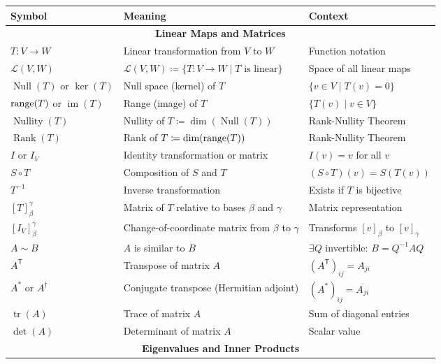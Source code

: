 \begin{center}
\vspace{0.5cm} %

\begin{tabularx}{\textwidth}{|l|X|X|}
\hline
\textbf{Symbol} & \textbf{Meaning} & \textbf{Context} \\
\hline
\multicolumn{3}{|c|}{\textbf{Linear Maps and Matrices}} \\
\hline
$T: V \to W$ & Linear transformation from $V$ to $W$ & Function notation \\
$\mathcal{L}(V, W)$ & $\mathcal{L}(V,W) \coloneqq \{T:V\to W \mid T\text{ is linear}\}$ & Space of all linear maps \\
$\operatorname{Null}(T)$ or $\ker(T)$ & Null space (kernel) of $T$ & $\{ v \in V \mid T(v) = 0 \}$ \\
$\operatorname{range}(T)$ or $\operatorname{im}(T)$ & Range (image) of $T$ & $\{ T(v) \mid v \in V \}$ \\
$\operatorname{Nullity}(T)$ & Nullity of $T \coloneqq \dim(\operatorname{Null}(T))$ & Rank-Nullity Theorem \\
$\operatorname{Rank}(T)$ & Rank of $T \coloneqq \dim(\operatorname{range}(T))$ & Rank-Nullity Theorem \\
$I$ or $I_V$ & Identity transformation or matrix & $I(v) = v$ for all $v$ \\
$S \circ T$ & Composition of $S$ and $T$ & $(S \circ T)(v) = S(T(v))$ \\
$T^{-1}$ & Inverse transformation & Exists if $T$ is bijective \\
$[T]_{\beta}^{\gamma}$ & Matrix of $T$ relative to bases $\beta$ and $\gamma$ & Matrix representation \\
$[I_V]_{\beta}^{\gamma}$ & Change-of-coordinate matrix from $\beta$ to $\gamma$ & Transforms $[v]_\beta$ to $[v]_\gamma$ \\
$A \sim B$ & $A$ is similar to $B$ & $\exists Q$ invertible: $B = Q^{-1} A Q$ \\
$A^{\mathsf{T}}$ & Transpose of matrix $A$ & $(A^{\mathsf{T}})_{ij} = A_{ji}$ \\
$A^*$ or $A^\dagger$ & Conjugate transpose (Hermitian adjoint) & $(A^*)_{ij} = \overline{A_{ji}}$ \\
$\operatorname{tr}(A)$ & Trace of matrix $A$ & Sum of diagonal entries \\
$\det(A)$ & Determinant of matrix $A$ & Scalar value \\
\hline
\multicolumn{3}{|c|}{\textbf{Eigenvalues and Inner Products}} \\

\end{tabularx}
\end{center}
